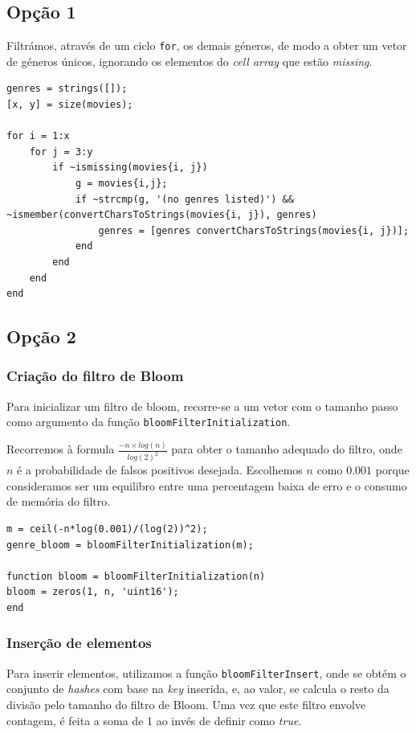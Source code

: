 \documentclass[portuguese, 11pt, a4paper,titlepage, oneside]{article}
\begin{document}
\subsection{Opção 1}
Filtrámos, através de um ciclo \verb|for|, os demais géneros, de modo a obter um vetor de géneros únicos, ignorando os elementos do \textit{cell array} que estão \textit{missing}.

\begin{lstlisting}[style=Matlab-editor]
genres = strings([]);
[x, y] = size(movies);

for i = 1:x
    for j = 3:y
        if ~ismissing(movies{i, j})
            g = movies{i,j};
            if ~strcmp(g, '(no genres listed)') && ~ismember(convertCharsToStrings(movies{i, j}), genres)
                genres = [genres convertCharsToStrings(movies{i, j})];
            end
        end
    end
end
\end{lstlisting}

\subsection{Opção 2}
\subsubsection{Criação do filtro de Bloom}
Para inicializar um filtro de bloom, recorre-se a um vetor com o tamanho passo como argumento da função \verb|bloomFilterInitialization|.

Recorremos à formula \(\frac{-n\times log(n)}{log(2)^2}\) para obter o tamanho adequado do filtro, onde \(n\) é a probabilidade de falsos positivos desejada. Escolhemos \(n\) como \(0.001\) porque consideramos ser um equilibro entre uma percentagem baixa de erro e o consumo de memória do filtro.

\begin{lstlisting}[style=Matlab-editor]
m = ceil(-n*log(0.001)/(log(2))^2);
genre_bloom = bloomFilterInitialization(m);

function bloom = bloomFilterInitialization(n)
bloom = zeros(1, n, 'uint16');
end
\end{lstlisting}

\subsubsection{Inserção de elementos} \label{2_insert}
Para inserir elementos, utilizamos a função \verb|bloomFilterInsert|, onde se obtém o conjunto de \textit{hashes} com base na \textit{key} inserida, e, ao valor, se calcula o resto da divisão pelo tamanho do filtro de Bloom. Uma vez que este filtro envolve contagem, é feita a soma de 1 ao invés de definir como \textit{true}.
\end{document}
